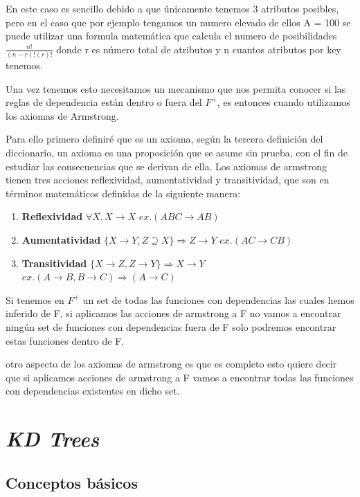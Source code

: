 \documentclass{cosas/tfg_domingo}
\begin{document}
En este caso es sencillo debido a que únicamente tenemos 3 atributos posibles, pero en el caso que por ejemplo tengamos un numero elevado de ellos A = 100 se puede utilizar una formula matemática que calcula el numero de posibilidades $\frac{n!}{(n-r)! (r)!}$ donde r es número total de atributos y n cuantos atributos por key tenemos.

Una vez tenemos esto necesitamos un mecanismo que nos permita conocer si las reglas de dependencia están dentro o fuera del $F^+$, es entonces cuando utilizamos los axiomas de Armstrong.

Para ello primero definiré que es un axioma, según la tercera definición del diccionario, un axioma es una proposición que se asume sin prueba, con el fin de estudiar las consecuencias que se derivan de ella. Los axiomas de armstrong tienen tres acciones reflexividad, aumentatividad y transitividad, que son en términos matemáticos definidas de la siguiente manera:

\begin{enumerate}
    \item \textbf{Reflexividad} $\forall X , X \rightarrow X $ $ex. (ABC \rightarrow AB)$
    
    \item \textbf{Aumentatividad} $\{ X \rightarrow Y , Z \supseteq X \} \Rightarrow Z \rightarrow Y  $ $ex. (AC \rightarrow CB)$
    
    \item \textbf{Transitividad} $ \{ X\rightarrow Z , Z \rightarrow Y \} \Rightarrow X \rightarrow Y $ $ex. (A \rightarrow B , B \rightarrow C) \Rightarrow (A \rightarrow C)$
\end{enumerate}

Si tenemos en $F^+$ un set de todas las funciones con dependencias las cuales hemos inferido de F, si aplicamos las acciones de armstrong a F no vamos a encontrar ningún set de funciones con dependencias fuera de F solo podremos encontrar estas funciones dentro de F.

otro aspecto de los axiomas de armstrong es que es completo esto quiere decir que si aplicamos acciones de armstrong a F vamos a encontrar todas las funciones con dependencias existentes en dicho set.




\chapter{\emph{KD Trees}}

\section{Conceptos básicos}
\end{document}
